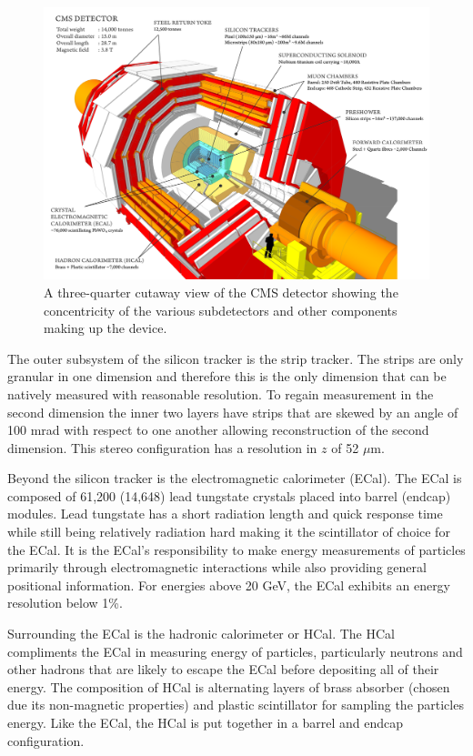 \documentclass[a4paper,12pt]{article}
\begin{document}
    \begin{figure}[ht]
        \begin{center}
            \includegraphics[width=0.9\linewidth]{Figures/CMS_Detector_Cutaway.png}
        \end{center}
        \caption{A three-quarter cutaway view of the CMS detector showing the
        concentricity of the various subdetectors and other
        components making up the device.\cite{CMSCutaway}}
        \label{fig:cms}
    \end{figure}
    
    The outer subsystem of the silicon tracker is the strip tracker. The strips
    are only granular in one dimension and therefore this is the only dimension
    that can be natively measured with reasonable resolution. To regain
    measurement in the second dimension the inner two layers have strips that
    are skewed by an angle of 100 mrad with respect to one another allowing
    reconstruction of the second dimension. This stereo configuration has a
    resolution in $z$ of 52 $\mu$m. 
    
    Beyond the silicon tracker is the electromagnetic calorimeter (ECal). The
    ECal is composed of 61,200 (14,648) lead tungstate crystals placed into
    barrel (endcap) modules. Lead tungstate has a short radiation length and
    quick response time while still being relatively radiation hard making it
    the scintillator of choice for the ECal. It is the ECal's responsibility to
    make energy measurements of particles primarily through electromagnetic
    interactions while also providing general positional information. For
    energies above 20 GeV, the ECal exhibits an energy resolution below 1\%.

    Surrounding the ECal is the hadronic calorimeter or HCal. The HCal
    compliments the ECal in measuring energy of particles, particularly neutrons
    and other hadrons that are likely to escape the ECal before depositing all
    of their energy. The composition of HCal is alternating layers of brass
    absorber (chosen due its non-magnetic properties) and plastic scintillator
    for sampling the particles energy. Like the ECal, the HCal is put together
    in a barrel and endcap configuration.
\end{document}
